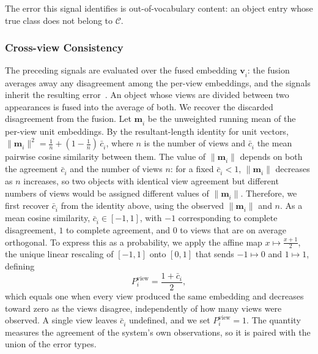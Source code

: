 The error this signal identifies is out-of-vocabulary content: an object entry whose true class does not belong to $\mathcal{C}$.

\subsubsection{Cross-view Consistency}
The preceding signals are evaluated over the fused embedding $\mathbf{v}^{}_i$: the fusion averages away any disagreement among the per-view embeddings, and the signals inherit the resulting error~\cite{puigjaner2026relationship}. An object whose views are divided between two appearances is fused into the average of both.
We recover the discarded disagreement from the fusion.
Let $\mathbf{m}^{}_i$ be the unweighted running mean of the per-view unit embeddings. By the resultant-length identity for unit vectors, $\lVert \mathbf{m}^{}_i \rVert^2 = \tfrac{1}{n} + (1-\tfrac{1}{n})\,\bar{c}^{}_i$, where $n$ is the number of views and $\bar{c}^{}_i$ the mean pairwise cosine similarity between them. The value of $\lVert \mathbf{m}^{}_i \rVert$ depends on both the agreement $\bar{c}^{}_i$ and the number of views $n$: for a fixed $\bar{c}^{}_i < 1$, $\lVert \mathbf{m}^{}_i \rVert$ decreases as $n$ increases, so two objects with identical view agreement but different numbers of views would be assigned different values of $\lVert \mathbf{m}^{}_i \rVert$.
Therefore, we first recover $\bar{c}^{}_i$ from the identity above, using the observed $\lVert \mathbf{m}^{}_i \rVert$ and $n$. As a mean cosine similarity, $\bar{c}^{}_i \in [-1, 1]$, with $-1$ corresponding to complete disagreement, $1$ to complete agreement, and $0$ to views that are on average orthogonal. To express this as a probability, we apply the affine map $x \mapsto \tfrac{x+1}{2}$, the unique linear rescaling of $[-1,1]$ onto $[0,1]$ that sends $-1 \mapsto 0$ and $1 \mapsto 1$, defining
\begin{equation}
    P^{\mathrm{view}}_i = \frac{1 + \bar{c}^{}_i}{2},
    \label{eq:crossview}
\end{equation}
which equals one when every view produced the same embedding and decreases toward zero as the views disagree, independently of how many views were observed. A single view leaves $\bar{c}^{}_i$ undefined, and we set $P^{\mathrm{view}}_i = 1$. The quantity measures the agreement of the system's own observations, so it is paired with the union of the error types.
